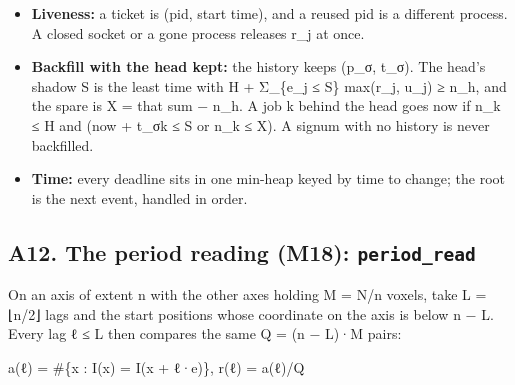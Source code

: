 \begin{itemize}
\item \textbf{Liveness:} a ticket is (pid, start time), and a reused pid is a different process. A closed socket or a gone process releases r\_\allowbreak{}j at once.
\item \textbf{Backfill with the head kept:} the history keeps (p\_\allowbreak{}σ, t\_\allowbreak{}σ). The head's shadow S is the least time with H + Σ\_\allowbreak{}\{e\_\allowbreak{}j ≤ S\} max(r\_\allowbreak{}j, u\_\allowbreak{}j) ≥ n\_\allowbreak{}h, and the spare is X = that sum − n\_\allowbreak{}h. A job k behind the head goes now if n\_\allowbreak{}k ≤ H and (now + t\_\allowbreak{}σk ≤ S or n\_\allowbreak{}k ≤ X). A signum with no history is never backfilled.
\item \textbf{Time:} every deadline sits in one min-heap keyed by time to change; the root is the next event, handled in order.
\end{itemize}

\subsection{\texorpdfstring{A12. The period reading (M18): \texttt{period\_\allowbreak{}read}}{A12. The period reading (M18): period\_read}}

On an axis of extent n with the other axes holding M = N/n voxels, take L = ⌊n/2⌋ lags and the start positions whose coordinate on the axis is below n − L. Every lag ℓ ≤ L then compares the same Q = (n − L)·M pairs:

a(ℓ) = \#\{x : I(x) = I(x + ℓ·e)\},  r(ℓ) = a(ℓ)/Q

